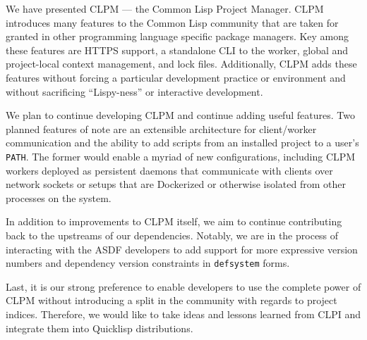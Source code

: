 \documentclass[format=sigconf]{acmart}
\begin{document}
We have presented CLPM --- the Common Lisp Project Manager. CLPM introduces
many features to the Common Lisp community that are taken for granted in other
programming language specific package managers. Key among these features are
HTTPS support, a standalone CLI to the worker, global and project-local context
management, and lock files. Additionally, CLPM adds these features without
forcing a particular development practice or environment and without
sacrificing ``Lispy-ness'' or interactive development.

We plan to continue developing CLPM and continue adding useful features. Two
planned features of note are an extensible architecture for client/worker
communication and the ability to add scripts from an installed project to a
user's {\tt PATH}. The former would enable a myriad of new configurations,
including CLPM workers deployed as persistent daemons that communicate with
clients over network sockets or setups that are Dockerized or otherwise
isolated from other processes on the system.

In addition to improvements to CLPM itself, we aim to continue contributing
back to the upstreams of our dependencies. Notably, we are in the process of
interacting with the ASDF developers to add support for more expressive version
numbers and dependency version constraints in {\tt defsystem} forms.

Last, it is our strong preference to enable developers to use the complete
power of CLPM without introducing a split in the community with regards to
project indices. Therefore, we would like to take ideas and lessons learned
from CLPI and integrate them into Quicklisp distributions.



\end{document}
